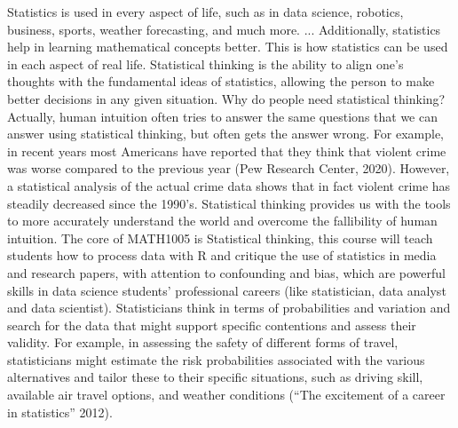 \documentclass{article}
\begin{document}
Statistics is used in every aspect of life, such as in data science, robotics, business, sports, weather forecasting, and much more. ... Additionally, statistics help in learning mathematical concepts better. This is how statistics can be used in each aspect of real life. Statistical thinking is the ability to align one’s thoughts with the fundamental ideas of statistics, allowing the person to make better decisions in any given situation. Why do people need statistical thinking? Actually, human intuition often tries to answer the same questions that we can answer using statistical thinking, but often gets the answer wrong. For example, in recent years most Americans have reported that they think that violent crime was worse compared to the previous year (Pew Research Center, 2020). However, a statistical analysis of the actual crime data shows that in fact violent crime has steadily decreased since the 1990’s. Statistical thinking provides us with the tools to more accurately understand the world and overcome the fallibility of human intuition. The core of MATH1005 is Statistical thinking, this course will teach students how to process data with R and critique the use of statistics in media and research papers, with attention to confounding and bias, which are powerful skills in data science students' professional careers (like statistician, data analyst and data scientist). Statisticians think in terms of probabilities and variation and search for the data that might support specific contentions and assess their validity. For example, in assessing the safety of different forms of travel, statisticians might estimate the risk probabilities associated with the various alternatives and tailor these to their specific situations, such as driving skill, available air travel options, and weather conditions (“The excitement of a career in statistics” 2012).
\end{document}
